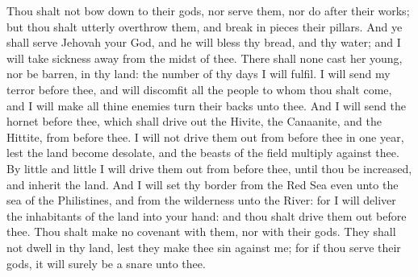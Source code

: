 Thou shalt not bow down to their gods, nor serve them, nor do after their works; but thou shalt utterly overthrow them, and break in pieces their pillars. And ye shall serve Jehovah your God, and he will bless thy bread, and thy water; and I will take sickness away from the midst of thee. There shall none cast her young, nor be barren, in thy land: the number of thy days I will fulfil. I will send my terror before thee, and will discomfit all the people to whom thou shalt come, and I will make all thine enemies turn their backs unto thee. And I will send the hornet before thee, which shall drive out the Hivite, the Canaanite, and the Hittite, from before thee. I will not drive them out from before thee in one year, lest the land become desolate, and the beasts of the field multiply against thee. By little and little I will drive them out from before thee, until thou be increased, and inherit the land. And I will set thy border from the Red Sea even unto the sea of the Philistines, and from the wilderness unto the River: for I will deliver the inhabitants of the land into your hand: and thou shalt drive them out before thee. Thou shalt make no covenant with them, nor with their gods. They shall not dwell in thy land, lest they make thee sin against me; for if thou serve their gods, it will surely be a snare unto thee. 

